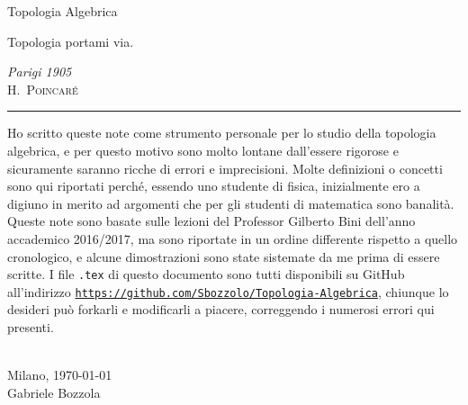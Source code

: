 \documentclass[10pt, twoside=false, x11names]{scrbook}
\begin{document}
\begin{titlepage}

  \noindent
  \titlefont Topologia Algebrica
  \epigraph{Topologia portami via.}%
  {\textit{Parigi 1905}\\ \textsc{H.\ Poincaré}}
  \null\vfill
  \vspace*{1cm}
  \noindent
  \hfill
  \begin{minipage}{0.35\linewidth}
    \begin{flushright}
      \printauthor
    \end{flushright}
  \end{minipage}
  \begin{minipage}{0.02\linewidth}
    \rule{1pt}{125pt}
  \end{minipage}
  \titlepagedecoration
\end{titlepage}


\vspace*{180pt}

Ho scritto queste note come strumento personale per lo studio della topologia
algebrica, e per questo motivo sono molto lontane dall'essere rigorose e
sicuramente saranno ricche di errori e imprecisioni. Molte definizioni o
concetti sono qui riportati perché, essendo uno studente di fisica, inizialmente
ero a digiuno in merito ad argomenti che per gli studenti di matematica sono
banalità. Queste note sono basate sulle lezioni del Professor Gilberto Bini
dell'anno accademico 2016/2017, ma sono riportate in un ordine differente
rispetto a quello cronologico, e alcune dimostrazioni sono state sistemate da me
prima di essere scritte. I file \texttt{.tex} di questo documento sono tutti
disponibili su GitHub all'indirizzo
\href{https://github.com/Sbozzolo/Topologia-Algebrica}{
  \texttt{https://github.com/Sbozzolo/Topologia-Algebrica}}, chiunque lo
desideri può forkarli e modificarli a piacere, correggendo i numerosi errori qui
presenti.
\\ \\
{
  \begin{flushright}
    Milano, \today \\
    Gabriele Bozzola
  \end{flushright}
}

\newpage
\end{document}
